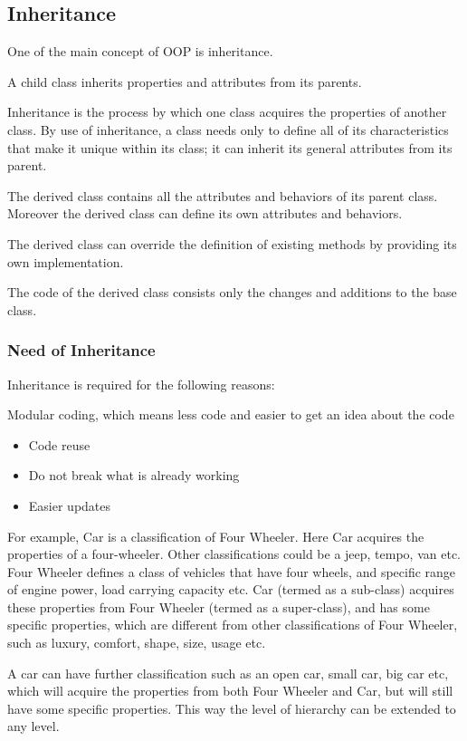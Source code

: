 \documentclass[11pt,a4paper]{article}
\begin{document}
\subsection*{Inheritance}
One of the main concept of OOP is inheritance.

A child class inherits properties and attributes from its parents. 

Inheritance is the process by which one class acquires the properties of another class. By use of inheritance, a class needs only to define all of its characteristics that make it unique within its class; it can inherit its general attributes from its parent.

The derived class contains all the attributes and behaviors of its parent class. Moreover the derived class can define its own attributes and behaviors.

The derived class can override the definition of existing methods by providing its own implementation.

The code of the derived class consists only the changes and additions to the base class.

\subsubsection*{Need of Inheritance}
Inheritance is required for the following reasons:

Modular coding, which means less code and easier to get an idea about the code
\begin{itemize}
\item Code reuse
\item Do not break what is already working
\item Easier updates
\end{itemize}

For example, Car is a classification of Four Wheeler. Here Car acquires the properties of a four-wheeler. Other classifications could be a jeep, tempo, van etc. Four Wheeler defines a class of vehicles that have four wheels, and specific range of engine power, load carrying capacity etc. Car (termed as a sub-class) acquires these properties from Four Wheeler (termed as a super-class), and has some specific properties, which are different from other classifications of Four Wheeler, such as luxury, comfort, shape, size, usage etc.

A car can have further classification such as an open car, small car, big car etc, which will acquire the properties from both Four Wheeler and Car, but will still have some specific properties. This way the level of hierarchy can be extended to any level.
\end{document}

